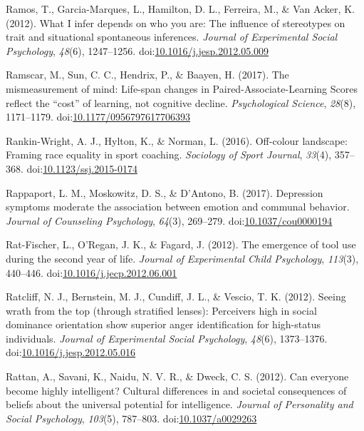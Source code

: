 \documentclass[english,man]{apa6}
\theoremstyle{definition}
\theoremstyle{definition}
\theoremstyle{definition}
\theoremstyle{remark}
\begin{document}
\hypertarget{ref-Ramos2012}{}
Ramos, T., Garcia-Marques, L., Hamilton, D. L., Ferreira, M., \& Van
Acker, K. (2012). What I infer depends on who you are: The influence of
stereotypes on trait and situational spontaneous inferences.
\emph{Journal of Experimental Social Psychology}, \emph{48}(6),
1247--1256.
doi:\href{https://doi.org/10.1016/j.jesp.2012.05.009}{10.1016/j.jesp.2012.05.009}

\hypertarget{ref-Ramscar2017}{}
Ramscar, M., Sun, C. C., Hendrix, P., \& Baayen, H. (2017). The
mismeasurement of mind: Life-span changes in Paired-Associate-Learning
Scores reflect the ``cost'' of learning, not cognitive decline.
\emph{Psychological Science}, \emph{28}(8), 1171--1179.
doi:\href{https://doi.org/10.1177/0956797617706393}{10.1177/0956797617706393}

\hypertarget{ref-Rankin-Wright2016}{}
Rankin-Wright, A. J., Hylton, K., \& Norman, L. (2016). Off-colour
landscape: Framing race equality in sport coaching. \emph{Sociology of
Sport Journal}, \emph{33}(4), 357--368.
doi:\href{https://doi.org/10.1123/ssj.2015-0174}{10.1123/ssj.2015-0174}

\hypertarget{ref-Rappaport2017}{}
Rappaport, L. M., Moskowitz, D. S., \& D'Antono, B. (2017). Depression
symptoms moderate the association between emotion and communal behavior.
\emph{Journal of Counseling Psychology}, \emph{64}(3), 269--279.
doi:\href{https://doi.org/10.1037/cou0000194}{10.1037/cou0000194}

\hypertarget{ref-Rat-Fischer2012}{}
Rat-Fischer, L., O'Regan, J. K., \& Fagard, J. (2012). The emergence of
tool use during the second year of life. \emph{Journal of Experimental
Child Psychology}, \emph{113}(3), 440--446.
doi:\href{https://doi.org/10.1016/j.jecp.2012.06.001}{10.1016/j.jecp.2012.06.001}

\hypertarget{ref-Ratcliff2012}{}
Ratcliff, N. J., Bernstein, M. J., Cundiff, J. L., \& Vescio, T. K.
(2012). Seeing wrath from the top (through stratified lenses):
Perceivers high in social dominance orientation show superior anger
identification for high-status individuals. \emph{Journal of
Experimental Social Psychology}, \emph{48}(6), 1373--1376.
doi:\href{https://doi.org/10.1016/j.jesp.2012.05.016}{10.1016/j.jesp.2012.05.016}

\hypertarget{ref-Rattan2012}{}
Rattan, A., Savani, K., Naidu, N. V. R., \& Dweck, C. S. (2012). Can
everyone become highly intelligent? Cultural differences in and societal
consequences of beliefs about the universal potential for intelligence.
\emph{Journal of Personality and Social Psychology}, \emph{103}(5),
787--803. doi:\href{https://doi.org/10.1037/a0029263}{10.1037/a0029263}
\end{document}
